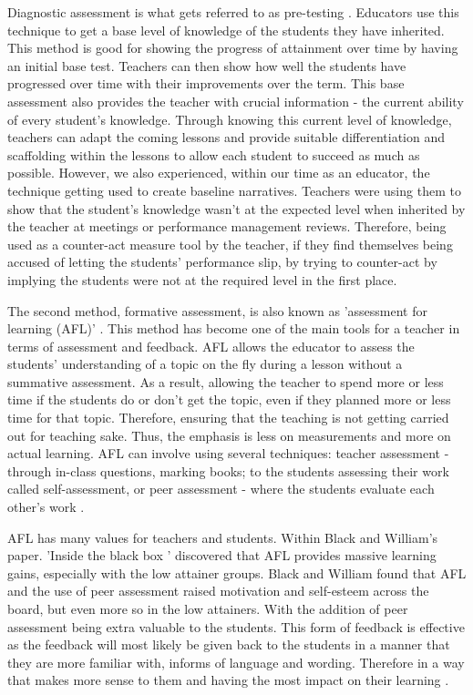 	Diagnostic assessment is what gets referred to as pre-testing \cite{wellington2007secondary}. Educators use this technique to get a base level of knowledge of the students they have inherited. This method is good for showing the progress of attainment over time by having an initial base test. Teachers can then show how well the students have progressed over time with their improvements over the term. This base assessment also provides the teacher with crucial information - the current ability of every student's knowledge. Through knowing this current level of knowledge, teachers can adapt the coming lessons and provide suitable differentiation and scaffolding within the lessons to allow each student to succeed as much as possible. However, we also experienced, within our time as an educator, the technique getting used to create baseline narratives. Teachers were using them to show that the student's knowledge wasn't at the expected level when inherited by the teacher at meetings or performance management reviews. Therefore, being used as a counter-act measure tool by the teacher, if they find themselves being accused of letting the students' performance slip, by trying to counter-act by implying the students were not at the required level in the first place.
	
	The second method, formative assessment, is also known as 'assessment for learning (AFL)' \cite{wellington2007secondary, dillon2011becoming}. This method has become one of the main tools for a teacher in terms of assessment and feedback. AFL allows the educator to assess the students' understanding of a topic on the fly during a lesson without a summative assessment. As a result, allowing the teacher to spend more or less time if the students do or don't get the topic, even if they planned more or less time for that topic. Therefore, ensuring that the teaching is not getting carried out for teaching sake. Thus, the emphasis is less on measurements and more on actual learning. AFL can involve using several techniques: teacher assessment - through in-class questions, marking books; to the students assessing their work called self-assessment, or peer assessment - where the students evaluate each other's work \cite{wellington2007secondary}.
	
	AFL has many values for teachers and students. Within Black and William's paper. 'Inside the black box \cite{black1998inside}' discovered that AFL provides massive learning gains, especially with the low attainer groups. Black and William found that AFL and the use of peer assessment raised motivation and self-esteem across the board, but even more so in the low attainers. With the addition of peer assessment being extra valuable to the students. This form of feedback is effective as the feedback will most likely be given back to the students in a manner that they are more familiar with, informs of language and wording. Therefore in a way that makes more sense to them and having the most impact on their learning \cite{torrance1998investigating, black1998inside}.
	
